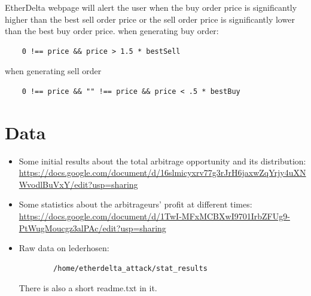 \documentclass[conference]{IEEEtran}
\begin{document}
\begin{itemize}
        EtherDelta webpage will alert the user when the buy order price is significantly higher than the best sell order price or the sell order price is significantly lower than the best buy order price.
when generating buy order:
\begin{verbatim}
    0 !== price && price > 1.5 * bestSell
\end{verbatim}

when generating sell order 
\begin{verbatim}
    0 !== price && "" !== price && price < .5 * bestBuy
\end{verbatim}


\end{itemize}
\section{Data}
\begin{itemize}
    \item Some initial results about the total arbitrage opportunity and its distribution:\\ \url{https://docs.google.com/document/d/16slmicyxrv77g3rJrH6jaxwZqYrjy4uXNWvodlBuVxY/edit?usp=sharing}
    \item Some statistics about the arbitrageurs' profit at different times:\\
    \url{https://docs.google.com/document/d/1TwI-MFxMCBXwI9701IrbZFUg9-PtWugMoucgz3alPAc/edit?usp=sharing}
    \item Raw data on lederhosen: 
    \begin{verbatim}
        /home/etherdelta_attack/stat_results
    \end{verbatim}
    There is also a short readme.txt in it.
\end{itemize}



\printbibliography
\end{document}
